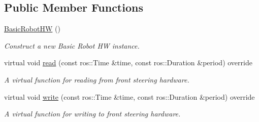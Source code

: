 \subsection*{Public Member Functions}
\begin{DoxyCompactItemize}
\item 
\mbox{\label{classBasicRobotHW_ae960fde21682e9be050fcd171bd5c671}} 
\hyperlink{classBasicRobotHW_ae960fde21682e9be050fcd171bd5c671}{Basic\+Robot\+HW} ()
\begin{DoxyCompactList}\small\item\em Construct a new Basic Robot HW instance. \end{DoxyCompactList}\item 
virtual void \hyperlink{classBasicRobotHW_a4246adb060fa49a3eb9d5d26845b6425}{read} (const ros\+::\+Time \&time, const ros\+::\+Duration \&period) override
\begin{DoxyCompactList}\small\item\em A virtual function for reading from front steering hardware. \end{DoxyCompactList}\item 
virtual void \hyperlink{classBasicRobotHW_a62add5eabfca2f88a5035db8b8240bb3}{write} (const ros\+::\+Time \&time, const ros\+::\+Duration \&period) override
\begin{DoxyCompactList}\small\item\em A virtual function for writing to front steering hardware. \end{DoxyCompactList}\end{DoxyCompactItemize}
